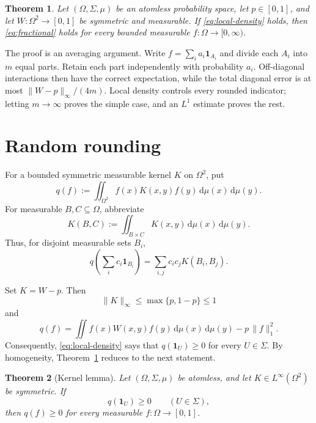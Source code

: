 \documentclass[reqno]{amsart}
\theoremstyle{plain}
\newtheorem{theorem}{Theorem}
\theoremstyle{remark}
\newcommand{\one}{\mathbf 1}
\newcommand{\dd}{\,\mathrm d}
\newcommand{\norminf}[1]{\lVert #1\rVert_\infty}
\newcommand{\normone}[1]{\lVert #1\rVert_1}
\begin{document}
\begin{theorem}\label{thm:main}
Let $(\Omega,\Sigma,\mu)$ be an atomless probability space, let $p\in[0,1]$,
and let $W\colon\Omega^2\to[0,1]$ be symmetric and measurable. If
\eqref{eq:local-density} holds, then \eqref{eq:fractional} holds for every
bounded measurable $f\colon\Omega\to[0,\infty)$.
\end{theorem}

The proof is an averaging argument. Write
$f=\sum_i a_i\one_{A_i}$ and divide each $A_i$ into $m$ equal parts. Retain
each part independently with probability $a_i$. Off-diagonal interactions
then have the correct expectation, while the total diagonal error is at most
$\norminf{W-p}/(4m)$. Local density controls every rounded indicator; letting
$m\to\infty$ proves the simple case, and an $L^1$ estimate proves the rest.

\section{Random rounding}

For a bounded symmetric measurable kernel $K$ on $\Omega^2$, put
\begin{equation}\label{eq:q-def}
  q(f):=\iint_{\Omega^2}f(x)K(x,y)f(y)\dd\mu(x)\dd\mu(y).
\end{equation}
For measurable $B,C\subseteq\Omega$, abbreviate
\begin{equation}\label{eq:KBC}
  K(B,C):=\iint_{B\times C}K(x,y)\dd\mu(x)\dd\mu(y).
\end{equation}
Thus, for disjoint measurable sets $B_i$,
\begin{equation}\label{eq:block-form}
  q\!\left(\sum_i c_i\one_{B_i}\right)
  =\sum_{i,j}c_i c_j K(B_i,B_j).
\end{equation}

Set $K=W-p$. Then
\begin{equation}\label{eq:K-bound}
  \norminf{K}\leq\max\{p,1-p\}\leq1
\end{equation}
and
\begin{equation}\label{eq:reduction}
  q(f)=\iint f(x)W(x,y)f(y)\dd\mu(x)\dd\mu(y)
       -p\,\normone{f}^{2}.
\end{equation}
Consequently, \eqref{eq:local-density} says that $q(\one_U)\geq0$ for every
$U\in\Sigma$. By homogeneity, Theorem~\ref{thm:main} reduces to the next
statement.

\begin{theorem}[Kernel lemma]\label{thm:kernel}
Let $(\Omega,\Sigma,\mu)$ be atomless, and let
$K\in L^\infty(\Omega^2)$ be symmetric. If
\[
  q(\one_U)\geq0\qquad(U\in\Sigma),
\]
then $q(f)\geq0$ for every measurable $f\colon\Omega\to[0,1]$.
\end{theorem}
\end{document}
